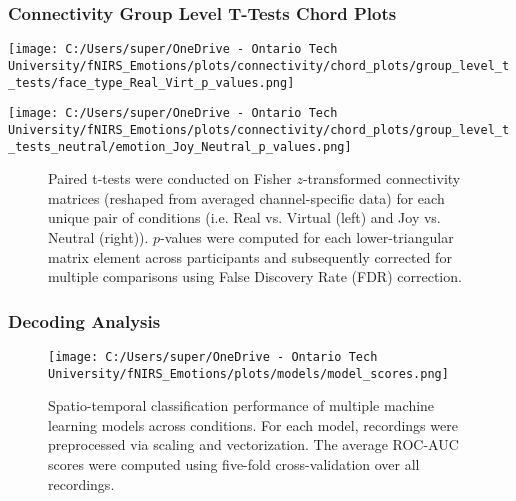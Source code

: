 \documentclass{beamer}
\begin{document}
\begin{frame}
    \frametitle{Connectivity Group Level T-Tests Chord Plots}
    \begin{minipage}[t]{0.45\textwidth}
        \vspace{-\baselineskip}
        \texttt{[image: C:/Users/super/OneDrive - Ontario Tech University/fNIRS\_Emotions/plots/connectivity/chord\_plots/group\_level\_t\_tests/face\_type\_Real\_Virt\_p\_values.png]}
    \end{minipage}
    \begin{minipage}[t]{0.45\textwidth}
        \vspace{-\baselineskip}
        \texttt{[image: C:/Users/super/OneDrive - Ontario Tech University/fNIRS\_Emotions/plots/connectivity/chord\_plots/group\_level\_t\_tests\_neutral/emotion\_Joy\_Neutral\_p\_values.png]}
    \end{minipage}
    \begin{figure}
        \caption{Paired t-tests were conducted on Fisher $z$-transformed connectivity matrices (reshaped from averaged channel-specific data) for each unique pair of conditions (i.e. Real vs. Virtual (left) and Joy vs. Neutral (right)).
        $p$-values were computed for each lower-triangular matrix element across participants and subsequently corrected for multiple comparisons using False Discovery Rate (FDR) correction.}
    \end{figure}
\end{frame}

\begin{frame}
    \frametitle{Decoding Analysis}
    \begin{figure}
        \texttt{[image: C:/Users/super/OneDrive - Ontario Tech University/fNIRS\_Emotions/plots/models/model\_scores.png]}
        \caption{Spatio-temporal classification performance of multiple machine learning models across conditions. For each model, recordings were preprocessed via scaling and vectorization. The average ROC-AUC scores were computed using five-fold cross-validation over all recordings. }
    \end{figure}
\end{frame}
\end{document}
